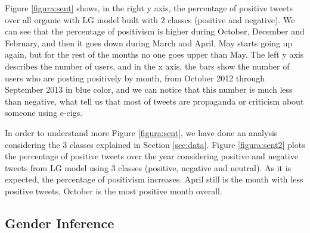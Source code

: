 \documentclass{sig-alternate}
\begin{document}
Figure \ref{figura:sent} shows, in the right y axis, the percentage of positive tweets over all organic with LG model built with 2 classes (positive and negative). We can see that the percentage of positivism is higher during October, December and February, and then it goes down during March and April. May starts going up again, but for the rest of the months no one goes upper than May. The left y axis describes the number of users, and in the x axis, the bars show the number of users who are posting positively by month, from October 2012 through September 2013 in blue color, and we can notice that this number is much less than negative, what tell us that most of tweets are propaganda or criticism about someone using e-cigs. 

In order to understand more Figure \ref{figura:sent}, we have done an analysis considering the 3 classes explained in Section \ref{sec:data}. Figure \ref{figura:sent2} plots the percentage of positive tweets over the year considering positive and negative tweets from LG model using 3 classes (positive, negative and neutral). As it is expected, the percentage of positivism increases. April still is the month with less positive tweets, October is the most positive month overall.

\subsection{Gender Inference}
\end{document}

